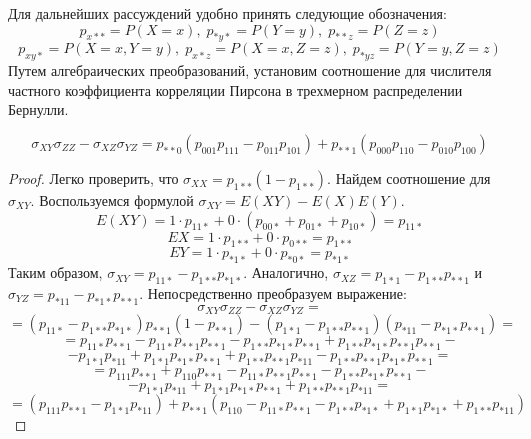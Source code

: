 Для дальнейших рассуждений удобно принять следующие обозначения: 
$$p_{x**}=P(X=x), \; p_{*y*}=P(Y=y), \; p_{**z}=P(Z=z)$$ 
$$  p_{xy*}=P(X=x, Y=y),\; p_{x*z}=P(X=x, Z=z), \; p_{*yz}=P(Y=y, Z=z)$$
Путем алгебраических преобразований, установим соотношение для числителя частного коэффициента корреляции Пирсона в трехмерном распределении Бернулли.
\begin{lemma}\label{partial_cov}
    $$\sigma_{XY} \sigma_{ZZ} - \sigma_{XZ} \sigma_{YZ} = p_{**0}(p_{001}p_{111}-p_{011}p_{101}) + p_{**1} (p_{000}p_{110}-p_{010}p_{100})$$
\end{lemma}
\begin{proof}
    Легко проверить, что $\sigma_{XX}= p_{1**}(1-p_{1**})$. Найдем соотношение для $\sigma_{XY}$. Воспользуемся формулой $\sigma_{XY}=E(X Y)-E(X)E(Y)$.
    $$E(X Y) = 1 \cdot p_{11*} + 0 \cdot (p_{00*} + p_{01*} + p_{10*})=p_{11*}$$
    $$EX = 1 \cdot p_{1**} + 0 \cdot p_{0**}=p_{1**}$$
    $$ EY = 1 \cdot p_{*1*} + 0 \cdot p_{*0*} = p_{*1*}$$
    Таким образом, $\sigma_{XY}=p_{11*}-p_{1**}p_{*1*}$. Аналогично, $\sigma_{XZ}=p_{1*1}-p_{1**}p_{**1}$ и $\sigma_{YZ}=p_{*11}-p_{*1*}p_{**1}$.
    Непосредственно преобразуем выражение:
    $$ \sigma_{XY} \sigma_{ZZ} - \sigma_{XZ} \sigma_{YZ} = $$
    $$
        = (p_{11*}-p_{1**}p_{*1*}) p_{**1}(1-p_{**1})
        -(p_{1*1}-p_{1**}p_{**1})(p_{*11}-p_{*1*}p_{**1})=
    $$
    $$
        = p_{11*}p_{**1} - p_{11*}p_{**1}p_{**1} - p_{1**}p_{*1*}p_{**1} + p_{1**}p_{*1*}p_{**1}p_{**1}-
    $$
    $$
        -p_{1*1}p_{*11}+p_{1*1}p_{*1*}p_{**1}+p_{1**}p_{**1}p_{*11} -p_{1**}p_{**1}p_{*1*}p_{**1}=
    $$
    $$
        =p_{111}p_{**1}+p_{110}p_{**1} - p_{11*}p_{**1}p_{**1} - p_{1**}p_{*1*}p_{**1} -
    $$ $$
        -p_{1*1}p_{*11}+p_{1*1}p_{*1*}p_{**1}+p_{1**}p_{**1}p_{*11}=
    $$
    \begin{equation}\label{some_step}
        =(p_{111}p_{**1}-p_{1*1}p_{*11})+p_{**1}(p_{110}-p_{11*}p_{**1} - p_{1**}p_{*1*} + p_{1*1}p_{*1*} + p_{1**}p_{*11})
    \end{equation}


\end{proof}
